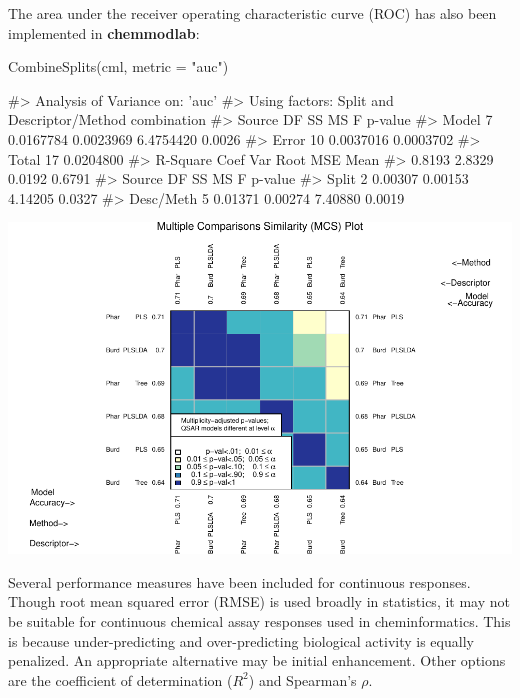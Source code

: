 The area under the receiver operating characteristic curve (ROC) has
also been implemented in \textbf{chemmodlab}:

\begin{Schunk}
\begin{Sinput}
CombineSplits(cml, metric = "auc")
\end{Sinput}
\begin{Soutput}
#>    Analysis of Variance on: 'auc'
#>  Using factors: Split and Descriptor/Method combination
#> Source    DF          SS          MS           F   p-value   
#> Model      7   0.0167784   0.0023969   6.4754420    0.0026   
#> Error     10   0.0037016   0.0003702   
#> Total     17   0.0204800   
#>       R-Square   Coef Var   Root MSE       Mean   
#>         0.8193     2.8329     0.0192     0.6791   
#> Source       DF        SS        MS         F   p-value   
#> Split         2   0.00307   0.00153   4.14205    0.0327   
#> Desc/Meth     5   0.01371   0.00274   7.40880    0.0019
\end{Soutput}

\includegraphics{chemmodlabRJournal_files/figure-latex/CombineSplits_auc-1} \end{Schunk}

Several performance measures have been included for continuous
responses. Though root mean squared error (RMSE) is used broadly in
statistics, it may not be suitable for continuous chemical assay
responses used in cheminformatics. This is because under-predicting and
over-predicting biological activity is equally penalized. An appropriate
alternative may be initial enhancement. Other options are the
coefficient of determination (\(R^2\)) and Spearman's \(\rho\).

